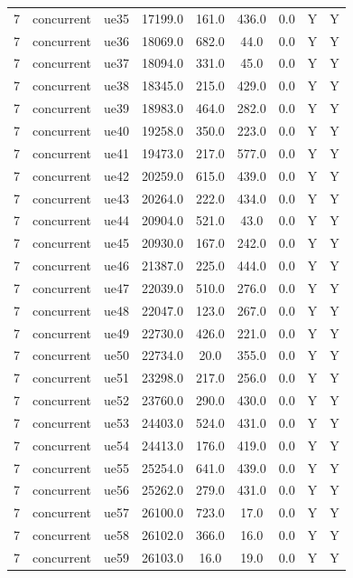 \begin{table}[ht]
\begin{tabular}{|c|c|c|c|c|c|c|c|c|}
7 & concurrent & ue35 & 17199.0 & 161.0 & 436.0 & 0.0 & Y & Y \\
7 & concurrent & ue36 & 18069.0 & 682.0 & 44.0 & 0.0 & Y & Y \\
7 & concurrent & ue37 & 18094.0 & 331.0 & 45.0 & 0.0 & Y & Y \\
7 & concurrent & ue38 & 18345.0 & 215.0 & 429.0 & 0.0 & Y & Y \\
7 & concurrent & ue39 & 18983.0 & 464.0 & 282.0 & 0.0 & Y & Y \\
7 & concurrent & ue40 & 19258.0 & 350.0 & 223.0 & 0.0 & Y & Y \\
7 & concurrent & ue41 & 19473.0 & 217.0 & 577.0 & 0.0 & Y & Y \\
7 & concurrent & ue42 & 20259.0 & 615.0 & 439.0 & 0.0 & Y & Y \\
7 & concurrent & ue43 & 20264.0 & 222.0 & 434.0 & 0.0 & Y & Y \\
7 & concurrent & ue44 & 20904.0 & 521.0 & 43.0 & 0.0 & Y & Y \\
7 & concurrent & ue45 & 20930.0 & 167.0 & 242.0 & 0.0 & Y & Y \\
7 & concurrent & ue46 & 21387.0 & 225.0 & 444.0 & 0.0 & Y & Y \\
7 & concurrent & ue47 & 22039.0 & 510.0 & 276.0 & 0.0 & Y & Y \\
7 & concurrent & ue48 & 22047.0 & 123.0 & 267.0 & 0.0 & Y & Y \\
7 & concurrent & ue49 & 22730.0 & 426.0 & 221.0 & 0.0 & Y & Y \\
7 & concurrent & ue50 & 22734.0 & 20.0 & 355.0 & 0.0 & Y & Y \\
7 & concurrent & ue51 & 23298.0 & 217.0 & 256.0 & 0.0 & Y & Y \\
7 & concurrent & ue52 & 23760.0 & 290.0 & 430.0 & 0.0 & Y & Y \\
7 & concurrent & ue53 & 24403.0 & 524.0 & 431.0 & 0.0 & Y & Y \\
7 & concurrent & ue54 & 24413.0 & 176.0 & 419.0 & 0.0 & Y & Y \\
7 & concurrent & ue55 & 25254.0 & 641.0 & 439.0 & 0.0 & Y & Y \\
7 & concurrent & ue56 & 25262.0 & 279.0 & 431.0 & 0.0 & Y & Y \\
7 & concurrent & ue57 & 26100.0 & 723.0 & 17.0 & 0.0 & Y & Y \\
7 & concurrent & ue58 & 26102.0 & 366.0 & 16.0 & 0.0 & Y & Y \\
7 & concurrent & ue59 & 26103.0 & 16.0 & 19.0 & 0.0 & Y & Y \\

\end{tabular}
\end{table}
